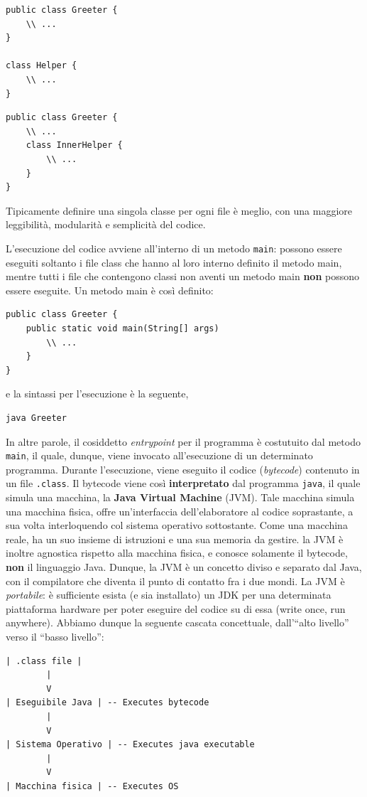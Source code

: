 \documentclass[\fontsizeclass,twocolumn]{\classname}
\theoremstyle{definition}
\theoremstyle{definition}
\begin{document}
\begin{lstlisting}
public class Greeter {
	\\ ...
}

class Helper {
	\\ ...
}
\end{lstlisting}

\begin{lstlisting}
public class Greeter {
	\\ ...
	class InnerHelper {
		\\ ...
	}
}
\end{lstlisting}

Tipicamente definire una singola classe per ogni file è meglio, con una
maggiore leggibilità, modularità e semplicità del codice.

L'esecuzione del codice avviene all'interno di un metodo \texttt{main}: possono
essere eseguiti soltanto i file class che hanno al loro interno definito il
metodo main, mentre tutti i file che contengono classi non aventi un metodo main
\textbf{non} possono essere eseguite. Un metodo main è così definito:

\begin{lstlisting}
public class Greeter {
	public static void main(String[] args)
		\\ ...
	}
}
\end{lstlisting}

e la sintassi per l'esecuzione è la seguente,

\begin{lstlisting}
java Greeter
\end{lstlisting}

In altre parole, il cosiddetto \emph{entrypoint} per il programma è costutuito
dal metodo \texttt{main}, il quale, dunque, viene invocato all'esecuzione di un
determinato programma.  Durante l'esecuzione, viene eseguito il codice
(\emph{bytecode}) contenuto in un file \texttt{.class}. Il bytecode viene così
\textbf{interpretato} dal programma \texttt{java}, il quale simula una macchina,
la \textbf{Java Virtual Machine} (JVM). Tale macchina simula una macchina
fisica, offre un'interfaccia dell'elaboratore al codice soprastante, a sua volta
interloquendo col sistema operativo sottostante. Come una macchina reale, ha un
suo insieme di istruzioni e una sua memoria da gestire. la JVM è inoltre
agnostica rispetto alla macchina fisica, e conosce solamente il bytecode,
\textbf{non} il linguaggio Java.  Dunque, la JVM è un concetto diviso e separato
dal Java, con il compilatore che diventa il punto di contatto fra i due
mondi. La JVM è \emph{portabile}: è sufficiente esista (e sia installato) un
JDK per una determinata piattaforma hardware per poter eseguire del codice su
di essa (write once, run anywhere). Abbiamo dunque la seguente cascata
concettuale, dall'``alto livello'' verso il ``basso livello'':
\begin{verbatim}
| .class file |
        |
        V
| Eseguibile Java | -- Executes bytecode
        |
        V
| Sistema Operativo | -- Executes java executable
        |
        V
| Macchina fisica | -- Executes OS
\end{verbatim}
\end{document}

